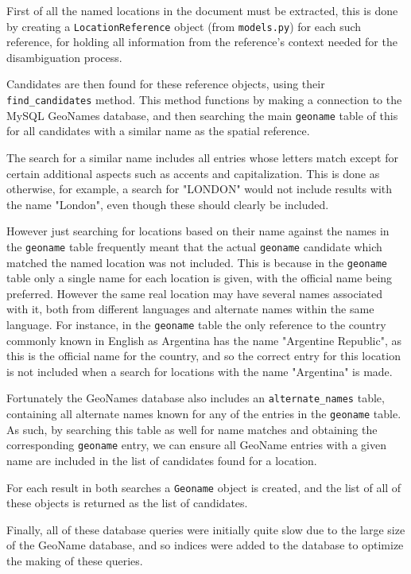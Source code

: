 \documentclass[12pt, a4paper]{report}
\begin{document}
First of all the named locations in the document must be extracted, this is done by creating a \verb#LocationReference# object (from \verb#models.py#) for each such reference, for holding all information from the reference's context needed for the disambiguation process.

Candidates are then found for these reference objects, using their \verb#find_candidates# method. This method functions by making a connection to the MySQL GeoNames database, and then searching the main \verb#geoname# table of this for all candidates with a similar name as the spatial reference.

The search for a similar name includes all entries whose letters match except for certain additional aspects such as accents and capitalization. This is done as otherwise, for example, a search for "LONDON" would not include results with the name "London", even though these should clearly be included.

However just searching for locations based on their name against the names in the \verb#geoname# table frequently meant that the actual \verb#geoname# candidate  which matched the named location was not included. This is because in the \verb#geoname# table only a single name for each location is given, with the official name being preferred. However the same real location may have several names associated with it, both from different languages and alternate names within the same language. For instance, in the \verb#geoname# table the only reference to the country commonly known in English as Argentina has the name "Argentine Republic", as this is the official name for the country, and so the correct entry for this location is not included when a search for locations with the name "Argentina" is made.

Fortunately the GeoNames database also includes an \verb#alternate_names# table, containing all alternate names known for any of the entries in the \verb#geoname# table. As such, by searching this table as well for name matches and obtaining the corresponding \verb#geoname# entry, we can ensure all GeoName entries with a given name are included in the list of candidates found for a location.

For each result in both searches a \verb#Geoname# object is created, and the list of all of these objects is returned as the list of candidates.

Finally, all of these database queries were initially quite slow due to the large size of the GeoName database, and so indices were added to the database to optimize the making of these queries.
\end{document}

